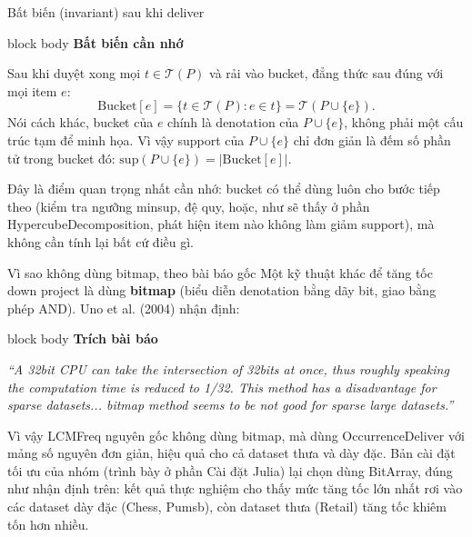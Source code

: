 \documentclass[9pt, aspectratio=169]{beamer}
\newenvironment{quietblock}[1]{%
  \begin{beamercolorbox}[wd=\linewidth,sep=5pt,rounded=true]{block body}
  {\color{psdearblue}\bfseries #1}\par\vspace{2pt}\footnotesize
}{%
  \end{beamercolorbox}
}
\begin{document}
\begin{frame}{Bất biến (invariant) sau khi deliver}
  \begin{quietblock}{Bất biến cần nhớ}
    Sau khi duyệt xong mọi $t\in\mathcal T(P)$ và rải vào bucket, đẳng thức
    sau đúng với mọi item $e$:
    \[
      \mathrm{Bucket}[e]
      =
      \{t\in\mathcal T(P): e\in t\}
      =
      \mathcal T(P\cup\{e\}).
    \]
    Nói cách khác, bucket của $e$ chính là denotation của $P\cup\{e\}$,
    không phải một cấu trúc tạm để minh họa. Vì vậy support của $P\cup\{e\}$
    chỉ đơn giản là đếm số phần tử trong bucket đó:
    $\mathrm{sup}(P\cup\{e\})=|\mathrm{Bucket}[e]|$.
  \end{quietblock}

  \vspace{0.25cm}
  \small
  Đây là điểm quan trọng nhất cần nhớ: bucket có thể dùng luôn cho bước
  tiếp theo (kiểm tra ngưỡng minsup, đệ quy, hoặc, như sẽ thấy ở phần
  HypercubeDecomposition, phát hiện item nào không làm giảm support), mà
  không cần tính lại bất cứ điều gì.
\end{frame}

\begin{frame}{Vì sao không dùng bitmap, theo bài báo gốc}
  \small
  Một kỹ thuật khác để tăng tốc down project là dùng \textbf{bitmap}
  (biểu diễn denotation bằng dãy bit, giao bằng phép AND). Uno et al.
  (2004) nhận định:

  \vspace{0.15cm}
  \begin{quietblock}{Trích bài báo}
    \textit{``A 32bit CPU can take the intersection of 32bits at once, thus
    roughly speaking the computation time is reduced to 1/32. This method
    has a disadvantage for sparse datasets... bitmap method seems to be
    not good for sparse large datasets.''}
  \end{quietblock}

  \vspace{0.2cm}
  Vì vậy LCMFreq nguyên gốc không dùng bitmap, mà dùng OccurrenceDeliver
  với mảng số nguyên đơn giản, hiệu quả cho cả dataset thưa và dày đặc.
  Bản cài đặt tối ưu của nhóm (trình bày ở phần Cài đặt Julia) lại chọn
  dùng BitArray, đúng như nhận định trên: kết quả thực nghiệm cho thấy mức
  tăng tốc lớn nhất rơi vào các dataset dày đặc (Chess, Pumsb), còn dataset
  thưa (Retail) tăng tốc khiêm tốn hơn nhiều.
\end{frame}
\end{document}
